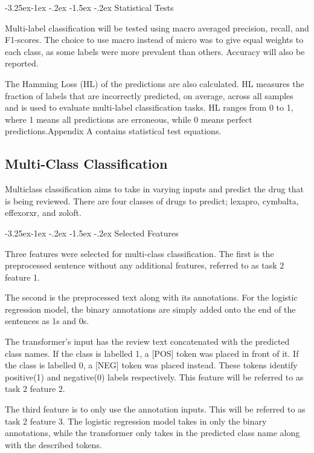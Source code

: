 \documentclass[10.7pt, onecolumn]{article}
\makeatletter
\renewcommand\subsubsection{\@startsection{subsubsection}{3}{\z@}%
	{-3.25ex\@plus -1ex \@minus -.2ex}%
    {-1.5ex \@plus -.2ex}%
    {\normalfont\itshape}}
\makeatother
\begin{document}
\subsubsection{Statistical Tests}

Multi-label classification will be tested using macro averaged precision, recall, and F1-scores. The choice to use macro instead of micro was to give equal weights to each class, as some labels were more prevalent than others. Accuracy will also be reported.

The Hamming Loss (HL) of the predictions are also calculated. HL measures the fraction of labels that are incorrectly predicted, on average, across all samples and is used to evaluate multi-label classification tasks\cite{hammingloss}. HL ranges from 0 to 1, where 1 means all predictions are erroneous, while 0 means perfect predictions.Appendix A contains statistical test equations.

\subsection{Multi-Class Classification}

Multiclass classification aims to take in varying inputs and predict the drug that is being reviewed. There are four classes of drugs to predict; lexapro, cymbalta, effexorxr, and zoloft.

\subsubsection{Selected Features}

Three features were selected for multi-class classification. The first is the preprocessed sentence without any additional features, referred to as task 2 feature 1. 

The second is the preprocessed text along with its annotations. For the logistic regression model, the binary annotations are simply added onto the end of the sentences as 1s and 0s. 

The transformer's input has the review text concatenated with the predicted class names. If the class is labelled 1, a [POS] token was placed in front of it. If the class is labelled 0, a [NEG] token was placed instead. These tokens identify positive(1) and negative(0) labels respectively. This feature will be referred to as task 2 feature 2.

The third feature is to only use the annotation inputs. This will be referred to as task 2 feature 3. The logistic regression model takes in only the binary annotations, while the transformer only takes in the predicted class name along with the described tokens.
\end{document}
